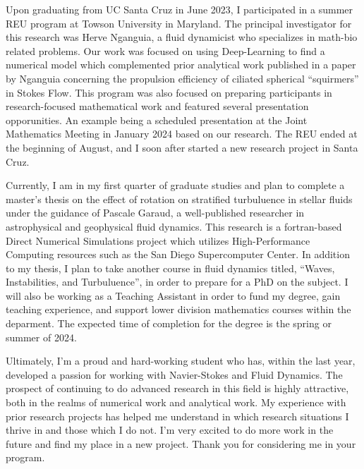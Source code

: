 \documentclass{article}
\begin{document}
Upon graduating from UC Santa Cruz in June 2023, I participated in a summer REU program at Towson University in Maryland. The principal investigator for this research was Herve Nganguia, a fluid dynamicist who specializes in math-bio related problems. Our work was focused on using Deep-Learning to find a numerical model which complemented prior analytical work published in a paper by Nganguia concerning the propulsion efficiency of ciliated spherical ``squirmers'' in Stokes Flow. This program was also focused on preparing participants in research-focused mathematical work and featured several presentation opporunities. An example being a scheduled presentation at the Joint Mathematics Meeting in January 2024 based on our research. The REU ended at the beginning of August, and I soon after started a new research project in Santa Cruz. 

Currently, I am in my first quarter of graduate studies and plan to complete a master's thesis on the effect of rotation on stratified turbuluence in stellar fluids under the guidance of Pascale Garaud, a well-published researcher in astrophysical and geophysical fluid dynamics. This research is a fortran-based Direct Numerical Simulations project which utilizes High-Performance Computing resources such as the San Diego Supercomputer Center. In addition to my thesis, I plan to take another course in fluid dynamics titled, ``Waves, Instabilities, and Turbuluence'', in order to prepare for a PhD on the subject. I will also be working as a Teaching Assistant in order to fund my degree, gain teaching experience, and support lower division mathematics courses within the deparment. The expected time of completion for the degree is the spring or summer of 2024. 

Ultimately, I'm a proud and hard-working student who has, within the last year, developed a passion for working with Navier-Stokes and Fluid Dynamics. The prospect of continuing to do advanced research in this field is highly attractive, both in the realms of numerical work and analytical work. My experience with prior research projects has helped me understand in which research situations I thrive in and those which I do not. I'm very excited to do more work in the future and find my place in a new project. Thank you for considering me in your program. 


 
\end{document}
